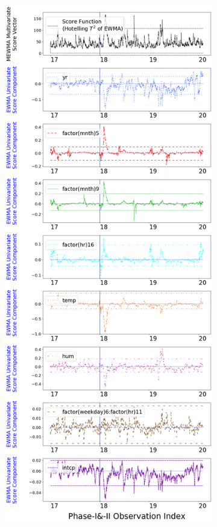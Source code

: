 \documentclass[twoside,11pt]{article}
\begin{document}
\begin{figure}[H]
\begin{subfigure}[t]{0.304\linewidth}
     \captionsetup{width=.95\linewidth}
     \caption{}
     \label{fig:bs_norm_retro_narrow}
\end{subfigure}
\begin{subfigure}[t]{0.374\linewidth}
     \centering
         \includegraphics[width=1.0\textwidth, trim=.0in .0in .0in .0in, clip]{../figures/v14/bike_sharing/reg_lin_PI_D_2/quadr/pos_single_bike_fisher_mlines_with_regu_1e-08_0_0001_0_01_99_99.png}

\end{subfigure}
\end{figure}
\end{document}

